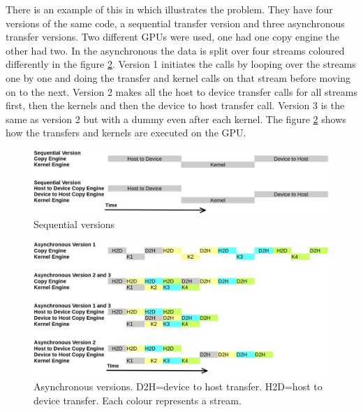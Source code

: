 \documentclass[10pt,a4paper]{report}
\begin{document}
There is an example of this in \cite{cuda_fortran_overlap} which illustrates the problem. They have four versions of the same code, a sequential transfer version and three asynchronous transfer versions. Two different GPUs were used, one had one copy engine the other had two. In the asynchronous the data is split over four streams coloured differently in the figure \ref{fig:ascynchronous}. Version 1 initiates the calls by looping over the streams one by one and doing the transfer and kernel calls on that stream before moving on to the next\cite{cuda_fortran_overlap}. Version 2 makes all the host to device transfer calls for all streams first, then the kernels and then the device to host transfer call\cite{cuda_fortran_overlap}. Version 3 is the same as version 2 but with a dummy even after each kernel\cite{cuda_fortran_overlap}. The figure \ref{fig:ascynchronous} shows how the transfers and kernels are executed on the GPU.

\begin{figure}[h]
    \centering
    \includegraphics[width=12cm]{streams_seq.jpg}
    \caption{Sequential versions}
    \label{fig:sequential}
\end{figure}

\begin{figure}[h]
    \centering
    \includegraphics[width=12cm]{streams_async.jpg}
    \caption{Asynchronous versions. D2H=device to host transfer. H2D=host to device transfer. Each colour represents a stream.}
    \label{fig:ascynchronous}
\end{figure}
\end{document}
